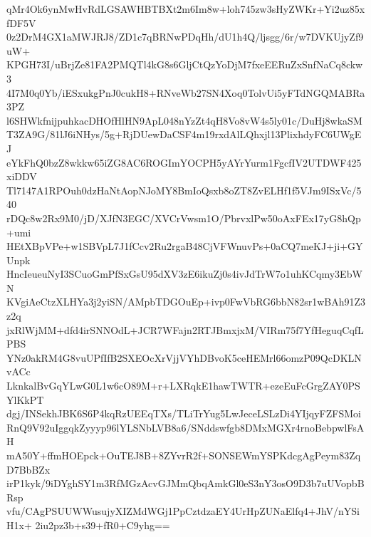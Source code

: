 qMr4Ok6ynMwHvRdLGSAWHBTBXt2m6Im8w+loh745zw3sHyZWKr+Yi2uz85xfDF5V
0z2DrM4GX1aMWJRJ8/ZD1c7qBRNwPDqHh/dU1h4Q/ljsgg/6r/w7DVKUjyZf9uW+
KPGH73I/uBrjZe81FA2PMQTl4kG8s6GljCtQzYoDjM7fxeEERuZxSnfNaCq8ckw3
4I7M0q0Yb/iESxukgPnJ0cukH8+RNveWb27SN4Xoq0TolvUi5yFTdNGQMABRa3PZ
l6SHWkfnijpuhkacDHOfHlHN9ApL048nYzZt4qH8Vo8vW4s5ly01c/DuHj8wkaSM
T3ZA9G/81lJ6iNHys/5g+RjDUewDaCSF4m19rxdAlLQhxjl13PlixhdyFC6UWgEJ
eYkFhQ0bzZ8wkkw65iZG8AC6ROGImYOCPH5yAYrYurm1FgcfIV2UTDWF425xiDDV
Tl7147A1RPOuh0dzHaNtAopNJoMY8BmIoQsxb8oZT8ZvELHf1f5VJm9ISxVc/540
rDQc8w2Rx9M0/jD/XJfN3EGC/XVCrVwsm1O/PbrvxlPw50oAxFEx17yG8hQp+umi
HEtXBpVPe+w1SBVpL7J1fCcv2Ru2rgaB48CjVFWnuvPs+0aCQ7meKJ+ji+GYUnpk
HncIeueuNyI3SCuoGmPfSxGsU95dXV3zE6ikuZj0s4ivJdTrW7o1uhKCqmy3EbWN
KVgiAeCtzXLHYa3j2yiSN/AMpbTDGOuEp+ivp0FwVbRG6bbN82sr1wBAh91Z3z2q
jxRlWjMM+dfd4irSNNOdL+JCR7WFajn2RTJBmxjxM/VIRm75f7YfHeguqCqfLPBS
YNz0akRM4G8vuUPfIfB2SXEOcXrVjjVYhDBvoK5ceHEMrl66omzP09QcDKLNvACc
LknkalBvGqYLwG0L1w6cO89M+r+LXRqkE1hawTWTR+ezeEuFcGrgZAY0PSYlKkPT
dgj/INSekhJBK6S6P4kqRzUEEqTXs/TLiTrYug5LwJeceLSLzDi4YIjqyFZFSMoi
RnQ9V92uIggqkZyyyp96lYLSNbLVB8a6/SNddswfgb8DMxMGXr4rnoBebpwlFsAH
mA50Y+ffmHOEpck+OuTEJ8B+8ZYvrR2f+SONSEWmYSPKdcgAgPeym83ZqD7BbBZx
irP1kyk/9iDYghSY1m3RfMGzAcvGJMmQbqAmkGl0eS3nY3osO9D3b7uUVopbBRsp
vfu/CAgPSUUWWusujyXIZMdWGj1PpCztdzaEY4UrHpZUNaElfq4+JhV/nYSiH1x+
2iu2pz3b+s39+fR0+C9yhg==
